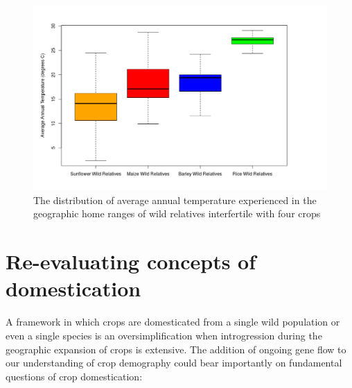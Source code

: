 \documentclass[11pt]{article}
\begin{document}
\begin{figure}[h]
	\centering
	\includegraphics[width=17.35cm]{boxplot.png}
	\caption{The distribution of average annual temperature experienced in the geographic home ranges of wild relatives interfertile with four crops}
	\label{fig:map}
\end{figure}

\section*{Re-evaluating concepts of domestication}

A framework in which crops are domesticated from a single wild population or even a single species is an oversimplification when introgression during the geographic expansion of crops is extensive.
The addition of ongoing gene flow to our understanding of crop demography could bear importantly on fundamental questions of crop domestication:
\end{document}
